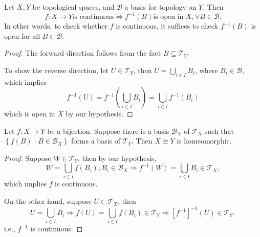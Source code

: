 \begin{example}


\begin{proposition} Let \(X,Y\) be topological spaces, and \(\mathcal{B}\) a basis for topology on \(Y\). Then
\[
f : X \rightarrow  Y\text{is continuous} \Leftrightarrow  {f}^{-1}\left(B\right) \text{is open in }X,\forall B \in  \mathcal{B}.
\]
In other words, to check whether $f$ is continuous, it suffices to check \({f}^{-1}\left(B\right)\) is open for all \(B \in  \mathcal{B}\).
\end{proposition}

\begin{proof} The forward direction follows from the fact \(B \subseteq  {\mathcal{T}}_Y\).

To show the reverse direction, let \(U \in  {\mathcal{T}}_Y\), then \(U = \mathop{\bigcup}\limits_{{i \in  I}}{B}_{i}\), where \({B}_{i} \in  \mathcal{B}\), which implies
\[
{f}^{-1}\left(U\right)  = {f}^{-1}\left({\mathop{\bigcup}\limits_{{i \in  I}}{B}_{i}}\right)  = \mathop{\bigcup}\limits_{{i \in  I}}{f}^{-1}\left({B}_{i}\right)
\]
which is open in \(X\) by our hypothesis.
\end{proof}

\begin{corollary} \label{cor:basis_homeo} Let \(f : X \rightarrow  Y\) be a bijection. Suppose there is a basis \({\mathcal{B}}_X\) of \({\mathcal{T}}_X\) such that \(\left\{  {f\left(B\right)  \mid  B \in  {\mathcal{B}}_X}\right\}\) forms a basis of \({\mathcal{T}}_Y\). Then \(X \cong  Y\) is homeomorphic.
\end{corollary}

\begin{proof} Suppose \(W \in  {\mathcal{T}}_Y\), then by our hypothesis,
\[
W = \mathop{\bigcup}\limits_{{i \in  I}}f\left({B}_{i}\right),{B}_{i} \in  {\mathcal{B}}_X \Rightarrow  {f}^{-1}\left(W\right)  = \mathop{\bigcup}\limits_{{i \in  I}}{B}_{i} \in  {\mathcal{T}}_X,
\]
which implies \(f\) is continuous.

On the other hand, suppose \(U \in  {\mathcal{T}}_X\), then
\[
U = \mathop{\bigcup}\limits_{{i \in  I}}{B}_{i} \Rightarrow  f\left(U\right)  = \mathop{\bigcup}\limits_{{i \in  I}}f\left({B}_{i}\right)  \in  {\mathcal{T}}_Y \Rightarrow  {\left\lbrack  {f}^{-1}\right\rbrack }^{-1}\left(U\right)  \in  {\mathcal{T}}_Y,
\]
i.e., \({f}^{-1}\) is continuous.
\end{proof}


\end{example}
